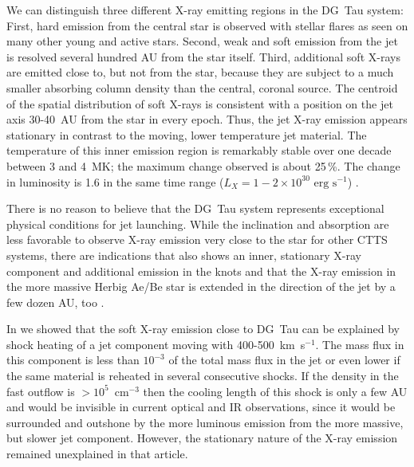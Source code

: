 \documentclass{emulateapj}
\begin{document}
We can distinguish three different X-ray emitting regions in the DG~Tau system: First, hard emission from the central star is observed with stellar flares as seen on many other young and active stars. Second, weak and soft emission from the jet is resolved several hundred AU from the star itself. Third, additional soft X-rays are emitted close to, but not from the star, because they are subject to a much smaller absorbing column density than the central, coronal source. The centroid of the spatial distribution of soft X-rays is consistent with a position on the jet axis 30-40~AU from the star \citep{2008A&A...488L..13S,2011ASPC..448..617G} in every epoch. Thus, the jet X-ray emission appears stationary in contrast to the moving, lower temperature jet material.  The temperature of this inner emission region is remarkably stable over one decade between 3 and 4~MK; the maximum change observed is about 25\,\%. The change in luminosity is 1.6 in the same time range ($L_X=1-2\times10^{30}\textrm{ erg s}^{-1}$) \citep{SchneiderDGTauXray}.

There is no reason to believe that the DG~Tau system represents exceptional physical conditions for jet launching. While the inclination and absorption are less favorable to observe X-ray emission very close to the star for other CTTS systems, there are indications that  also shows an inner, stationary X-ray component and additional emission in the knots \citep{2011A&A...530A.123S,2011ApJ...737...54B} and that the X-ray emission in the more massive Herbig Ae/Be star  is extended in the direction of the jet by a few dozen AU, too \citep{2005ApJ...628..811S,2009A&A...494.1041G,2013A&A...552A.142G}.

In \citet{2009A&A...493..579G} we showed that the soft X-ray emission close to DG~Tau can be explained by shock heating of a jet component moving with 400-500~km~s$^{-1}$. The mass flux in this component is less than $10^{-3}$ of the total mass flux in the jet or even lower if the same material is reheated in several consecutive shocks. If the density in the fast outflow is $>10^5$~cm$^{-3}$ then the cooling length of this shock is only a few AU and would be invisible in current optical and IR observations, since it would be surrounded and outshone by the more luminous emission from the more massive, but slower jet component. However, the stationary nature of the X-ray emission remained unexplained in that article.
\end{document}
